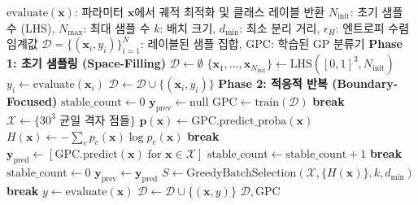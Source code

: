 \documentclass[11pt]{article}
\begin{document}
\begin{algorithm}[htbp]
\caption{Entropy-based Adaptive Sampling}\label{alg:adaptive-sampling}
\begin{algorithmic}[1]
\Require $\text{evaluate}(\mathbf{x})$: 파라미터 $\mathbf{x}$에서 궤적 최적화 및 클래스 레이블 반환
\Require $N_{\text{init}}$: 초기 샘플 수 (LHS), $N_{\text{max}}$: 최대 샘플 수
\Require $k$: 배치 크기, $d_{\min}$: 최소 분리 거리, $\epsilon_H$: 엔트로피 수렴 임계값
\Ensure $\mathcal{D} = \{(\mathbf{x}_i, y_i)\}_{i=1}^N$: 레이블된 샘플 집합, $\text{GPC}$: 학습된 GP 분류기
\Statex
\Statex \textbf{Phase 1: 초기 샘플링 (Space-Filling)}
\State $\mathcal{D} \leftarrow \emptyset$
\State $\{\mathbf{x}_1, \dots, \mathbf{x}_{N_{\text{init}}}\} \leftarrow \text{LHS}([0,1]^3, N_{\text{init}})$ 
  \State $y_i \leftarrow \text{evaluate}(\mathbf{x}_i)$
  \State $\mathcal{D} \leftarrow \mathcal{D} \cup \{(\mathbf{x}_i, y_i)\}$
\EndFor
\Statex
\Statex \textbf{Phase 2: 적응적 반복 (Boundary-Focused)}
\State $\text{stable\_count} \leftarrow 0$
\State $\mathbf{y}_{\text{prev}} \leftarrow \text{null}$
  \State $\text{GPC} \leftarrow \text{train}(\mathcal{D})$ 
   \textbf{break} \EndIf
  \Statex {}
  \State $\mathcal{X} \leftarrow \{30^3 \text{ 균일 격자 점들}\}$
    \State $\mathbf{p}(\mathbf{x}) \leftarrow \text{GPC.predict\_proba}(\mathbf{x})$
    \State $H(\mathbf{x}) \leftarrow -\sum_c p_c(\mathbf{x}) \log p_c(\mathbf{x})$
  \EndFor
  \Statex {}
   \textbf{break} \EndIf
  \Statex {}
  \State $\mathbf{y}_{\text{pred}} \leftarrow [\text{GPC.predict}(\mathbf{x}) \; \text{for } \mathbf{x} \in \mathcal{X}]$
    \State $\text{stable\_count} \leftarrow \text{stable\_count} + 1$
     \textbf{break} \EndIf
  \Else
    \State $\text{stable\_count} \leftarrow 0$
  \EndIf
  \State $\mathbf{y}_{\text{prev}} \leftarrow \mathbf{y}_{\text{pred}}$
  \Statex {}
  \State $S \leftarrow \text{GreedyBatchSelection}(\mathcal{X}, \{H(\mathbf{x})\}, k, d_{\min})$
   \textbf{break} \EndIf
  \Statex {}
    \State $y \leftarrow \text{evaluate}(\mathbf{x})$
    \State $\mathcal{D} \leftarrow \mathcal{D} \cup \{(\mathbf{x}, y)\}$
  \EndFor
\EndWhile
\State \Return $\mathcal{D}, \text{GPC}$
\end{algorithmic}
\end{algorithm}
\end{document}
